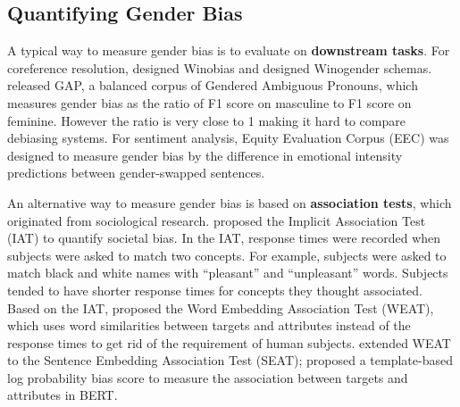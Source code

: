 \subsection{Quantifying Gender Bias}
A typical way to measure gender bias is to evaluate on
\textbf{downstream tasks}. For coreference resolution,
\cite{zhao2018gender} designed Winobias and
\cite{rudinger2018gender} designed Winogender schemas. \cite{webster2018mind} released GAP, a
balanced corpus of Gendered Ambiguous Pronouns, which
measures gender bias as the ratio of F1 score on masculine
to F1 score on feminine. However the ratio is very close to 1  making it hard to compare debiasing systems. For sentiment analysis, Equity Evaluation Corpus (EEC)  was designed to measure gender bias by the difference in emotional intensity predictions between gender-swapped sentences.

An alternative way to measure gender bias is based on \textbf{association tests}, which originated from sociological research. \cite{greenwald1998measuring} proposed the Implicit Association Test (IAT) to quantify societal bias. In the IAT, response times were recorded when subjects were asked to match two concepts. For example, subjects were asked to match black and white names with ``pleasant'' and ``unpleasant'' words. Subjects tended to have shorter response times for concepts they thought associated. Based on the IAT, \cite{caliskan2017semantics} proposed the Word Embedding Association Test (WEAT), which uses word similarities between targets and attributes instead of the response times to get rid of the requirement of human subjects. \cite{may2019measuring} extended WEAT to the Sentence Embedding Association Test (SEAT); \cite{kurita2019measuring} proposed a template-based log probability bias score to measure the association between targets and attributes in BERT.



